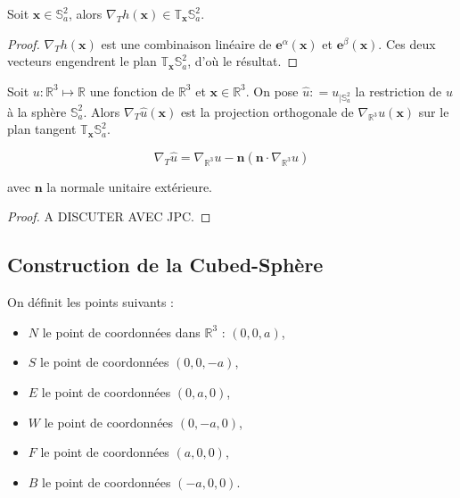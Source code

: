 \begin{proposition}
Soit $\mathbf{x} \in \mathbb{S}_a^2$, alors $\nabla_{T} h (\mathbf{x}) \in \mathbb{T}_{\mathbf{x}} \mathbb{S}_a^2$.
\end{proposition}

\begin{proof}
$\nabla_{T} h (\mathbf{x})$ est une combinaison linéaire de $\mathbf{e}^{\alpha}(\mathbf{x})$ et $\mathbf{e}^{\beta}(\mathbf{x})$. Ces deux vecteurs engendrent le plan $\mathbb{T}_{\mathbf{x}}\mathbb{S}_a^2$, d'où le résultat.
\end{proof}

\begin{proposition}
Soit $u: \mathbb{R}^3 \mapsto \mathbb{R}$ une fonction de $\mathbb{R}^3$ et $\mathbf{x} \in \mathbb{R}^3$. On pose $\hat{u} : = u_{|\mathbb{S}_a^2}$ la restriction de $u$ à la sphère $\mathbb{S}_a^2$. Alors $\nabla_{T} \hat{u} (\mathbf{x})$ est la projection orthogonale de $\nabla_{\mathbb{R}^3} u (\mathbf{x})$ sur le plan tangent $\mathbb{T}_{\mathbf{x}} \mathbb{S}_a^2$.

\begin{equation}
\nabla_T \hat{u} = \nabla_{\mathbb{R}^3} u - \mathbf{n} \left( \mathbf{n} \cdot \nabla_{\mathbb{R}^3} u \right)
\end{equation}

avec $\mathbf{n}$ la normale unitaire extérieure.
\end{proposition}

\begin{proof}
A DISCUTER AVEC JPC.
\end{proof}





\subsection{Construction de la Cubed-Sphère}

On définit les points suivants :
\begin{itemize}
\item $N$ le point de coordonnées dans $\mathbb{R}^3$ : $(0,0,a)$,
\item $S$ le point de coordonnées $(0,0,-a)$,
\item $E$ le point de coordonnées $(0,a,0)$,
\item $W$ le point de coordonnées $(0,-a,0)$,
\item $F$ le point de coordonnées $(a,0,0)$,
\item $B$ le point de coordonnées $(-a,0,0)$.
\end{itemize}

